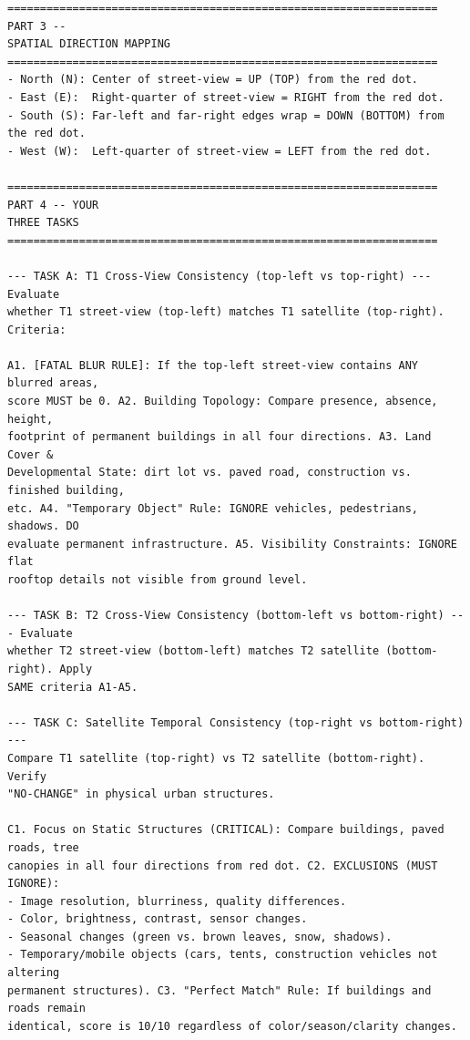 \begin{promptbox}
\begin{verbatim}
================================================================== PART 3 --
SPATIAL DIRECTION MAPPING
==================================================================
- North (N): Center of street-view = UP (TOP) from the red dot.
- East (E):  Right-quarter of street-view = RIGHT from the red dot.
- South (S): Far-left and far-right edges wrap = DOWN (BOTTOM) from the red dot.
- West (W):  Left-quarter of street-view = LEFT from the red dot.

================================================================== PART 4 -- YOUR
THREE TASKS ==================================================================

--- TASK A: T1 Cross-View Consistency (top-left vs top-right) --- Evaluate
whether T1 street-view (top-left) matches T1 satellite (top-right). Criteria:

A1. [FATAL BLUR RULE]: If the top-left street-view contains ANY blurred areas,
score MUST be 0. A2. Building Topology: Compare presence, absence, height,
footprint of permanent buildings in all four directions. A3. Land Cover &
Developmental State: dirt lot vs. paved road, construction vs. finished building,
etc. A4. "Temporary Object" Rule: IGNORE vehicles, pedestrians, shadows. DO
evaluate permanent infrastructure. A5. Visibility Constraints: IGNORE flat
rooftop details not visible from ground level.

--- TASK B: T2 Cross-View Consistency (bottom-left vs bottom-right) --- Evaluate
whether T2 street-view (bottom-left) matches T2 satellite (bottom-right). Apply
SAME criteria A1-A5.

--- TASK C: Satellite Temporal Consistency (top-right vs bottom-right) ---
Compare T1 satellite (top-right) vs T2 satellite (bottom-right). Verify
"NO-CHANGE" in physical urban structures.

C1. Focus on Static Structures (CRITICAL): Compare buildings, paved roads, tree
canopies in all four directions from red dot. C2. EXCLUSIONS (MUST IGNORE):
- Image resolution, blurriness, quality differences.
- Color, brightness, contrast, sensor changes.
- Seasonal changes (green vs. brown leaves, snow, shadows).
- Temporary/mobile objects (cars, tents, construction vehicles not altering
permanent structures). C3. "Perfect Match" Rule: If buildings and roads remain
identical, score is 10/10 regardless of color/season/clarity changes.
\end{verbatim}
\end{promptbox}
\endgroup

